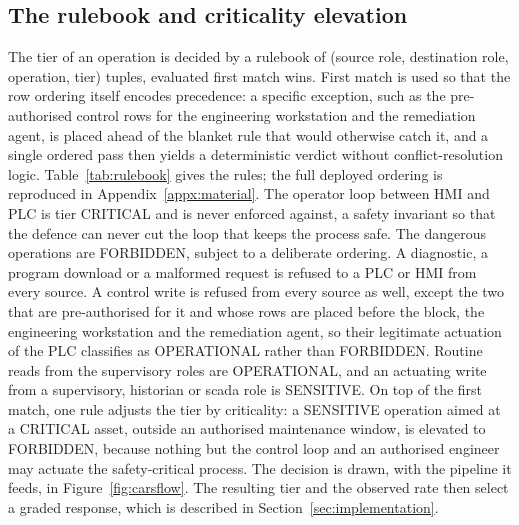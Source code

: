 \subsection{The rulebook and criticality elevation}

The tier of an operation is decided by a rulebook of (source role, destination role, operation, tier) tuples, evaluated first match wins. First match is used so that the row ordering itself encodes precedence: a specific exception, such as the pre-authorised control rows for the engineering workstation and the remediation agent, is placed ahead of the blanket rule that would otherwise catch it, and a single ordered pass then yields a deterministic verdict without conflict-resolution logic. Table~\ref{tab:rulebook} gives the rules; the full deployed ordering is reproduced in Appendix~\ref{appx:material}. The operator loop between HMI and PLC is tier CRITICAL and is never enforced against, a safety invariant so that the defence can never cut the loop that keeps the process safe. The dangerous operations are FORBIDDEN, subject to a deliberate ordering. A diagnostic, a program download or a malformed request is refused to a PLC or HMI from every source. A control write is refused from every source as well, except the two that are pre-authorised for it and whose rows are placed before the block, the engineering workstation and the remediation agent, so their legitimate actuation of the PLC classifies as OPERATIONAL rather than FORBIDDEN. Routine reads from the supervisory roles are OPERATIONAL, and an actuating write from a supervisory, historian or scada role is SENSITIVE. On top of the first match, one rule adjusts the tier by criticality: a SENSITIVE operation aimed at a CRITICAL asset, outside an authorised maintenance window, is elevated to FORBIDDEN, because nothing but the control loop and an authorised engineer may actuate the safety-critical process. The decision is drawn, with the pipeline it feeds, in Figure~\ref{fig:carsflow}. The resulting tier and the observed rate then select a graded response, which is described in Section~\ref{sec:implementation}.

